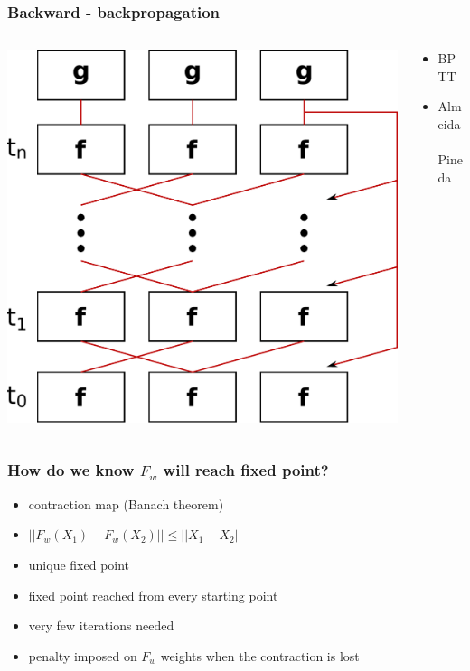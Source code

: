 \documentclass{beamer}
\begin{document}
\begin{frame}
\frametitle{Backward - backpropagation}
\begin{columns}
	\begin{column}{0.66\textwidth}
		\includegraphics[scale=0.4]{img/backward}
	\end{column}
	\begin{column}{0.34\textwidth}
		\begin{itemize}
			\item BPTT
			\item Almeida-Pineda
		\end{itemize}
	\end{column}
\end{columns}
\end{frame}

\begin{frame}
\frametitle{How do we know $F_w$ will reach fixed point?}
\begin{itemize}
	\item contraction map (Banach theorem)
	\item $||F_w(X_1) - F_w(X_2)|| \leq ||X_1 - X_2||$
	\item unique fixed point
	\item fixed point reached from every starting point
	\item very few iterations needed
	\item penalty imposed on $F_w$ weights when the contraction is lost
\end{itemize}
\end{frame}
\end{document}
